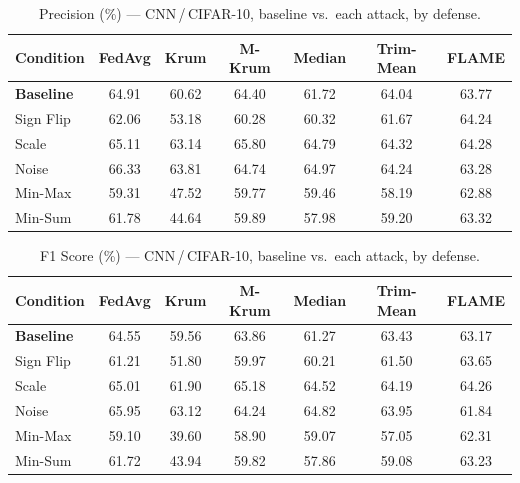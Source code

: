 \begin{table}[t]
\centering
\caption{Precision (\%) --- CNN\,/\,CIFAR-10, baseline vs.\ each attack, by defense.}
\label{tab:cnn_precision}
\footnotesize
\begin{tabular}{lcccccc}
\toprule
Condition & FedAvg & Krum & M-Krum & Median & Trim-Mean & FLAME \\
\midrule
\textbf{Baseline} & 64.91 & 60.62 & 64.40 & 61.72 & 64.04 & 63.77 \\
\midrule
Sign Flip & 62.06 & 53.18 & 60.28 & 60.32 & 61.67 & 64.24 \\
Scale & 65.11 & 63.14 & 65.80 & 64.79 & 64.32 & 64.28 \\
Noise & 66.33 & 63.81 & 64.74 & 64.97 & 64.24 & 63.28 \\
Min-Max & 59.31 & 47.52 & 59.77 & 59.46 & 58.19 & 62.88 \\
Min-Sum & 61.78 & 44.64 & 59.89 & 57.98 & 59.20 & 63.32 \\
\bottomrule
\end{tabular}
\end{table}

\begin{table}[t]
\centering
\caption{F1 Score (\%) --- CNN\,/\,CIFAR-10, baseline vs.\ each attack, by defense.}
\label{tab:cnn_f1}
\footnotesize
\begin{tabular}{lcccccc}
\toprule
Condition & FedAvg & Krum & M-Krum & Median & Trim-Mean & FLAME \\
\midrule
\textbf{Baseline} & 64.55 & 59.56 & 63.86 & 61.27 & 63.43 & 63.17 \\
\midrule
Sign Flip & 61.21 & 51.80 & 59.97 & 60.21 & 61.50 & 63.65 \\
Scale & 65.01 & 61.90 & 65.18 & 64.52 & 64.19 & 64.26 \\
Noise & 65.95 & 63.12 & 64.24 & 64.82 & 63.95 & 61.84 \\
Min-Max & 59.10 & 39.60 & 58.90 & 59.07 & 57.05 & 62.31 \\
Min-Sum & 61.72 & 43.94 & 59.82 & 57.86 & 59.08 & 63.23 \\
\bottomrule
\end{tabular}
\end{table}
